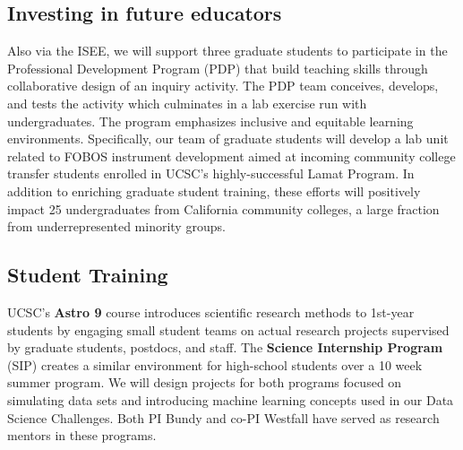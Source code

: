 \documentclass[oneside,11pt]{amsart}
\begin{document}
\subsection{Investing in future educators} Also via the ISEE, we will
support three graduate students to participate in the Professional
Development Program (PDP) that build teaching skills through
collaborative design of an inquiry activity.  The PDP team conceives,
develops, and tests the activity which culminates in a lab exercise
run with undergraduates. The program
emphasizes inclusive and equitable learning environments.  Specifically, our team of graduate
students will develop a lab unit related to FOBOS instrument development aimed at
incoming community college transfer students enrolled in UCSC's
highly-successful Lamat Program.  In addition to enriching graduate
student training, these efforts will positively impact 25
undergraduates from California community colleges, a large fraction
from underrepresented minority groups.

\subsection{Student Training} UCSC's {\bf Astro 9} course introduces scientific research methods to 1st-year students
by engaging small student teams on actual research projects supervised by graduate students,
postdocs, and staff.  The {\bf Science Internship Program} (SIP) creates a similar environment for high-school students
 over a 10 week summer program.  We will design projects for both programs focused on simulating data sets and
 introducing machine learning concepts used in our Data Science Challenges.  Both PI Bundy and co-PI Westfall have
 served as research mentors in these programs.

\newpage

\setcounter{page}{1}


\end{document}
